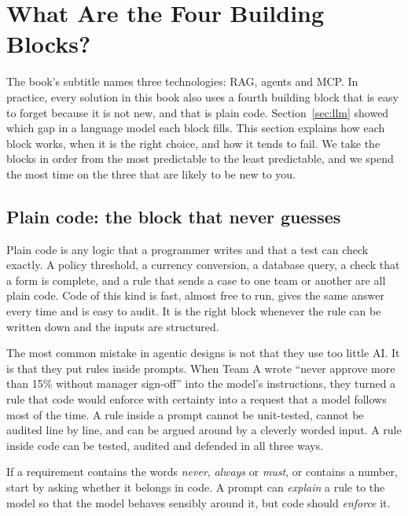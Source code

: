 
\section{What Are the Four Building Blocks?}
\label{sec:blocks}

The book's subtitle names three technologies: RAG, agents and MCP. In practice, every solution in this book also uses a fourth building block that is easy to forget because it is not new, and that is plain code. Section~\ref{sec:llm} showed which gap in a language model each block fills. This section explains how each block works, when it is the right choice, and how it tends to fail. We take the blocks in order from the most predictable to the least predictable, and we spend the most time on the three that are likely to be new to you.

\subsection{Plain code: the block that never guesses}
\label{sec:block-code}

Plain code is any logic that a programmer writes and that a test can check exactly. A policy threshold, a currency conversion, a database query, a check that a form is complete, and a rule that sends a case to one team or another are all plain code. Code of this kind is fast, almost free to run, gives the same answer every time and is easy to audit. It is the right block whenever the rule can be written down and the inputs are structured.

The most common mistake in agentic designs is not that they use too little AI. It is that they put rules inside prompts. When Team A wrote ``never approve more than 15\% without manager sign-off'' into the model's instructions, they turned a rule that code would enforce with certainty into a request that a model follows most of the time. A rule inside a prompt cannot be unit-tested, cannot be audited line by line, and can be argued around by a cleverly worded input. A rule inside code can be tested, audited and defended in all three ways.

\begin{designnote}
If a requirement contains the words \emph{never}, \emph{always} or \emph{must}, or contains a number, start by asking whether it belongs in code. A prompt can \emph{explain} a rule to the model so that the model behaves sensibly around it, but code should \emph{enforce} it.
\end{designnote}


